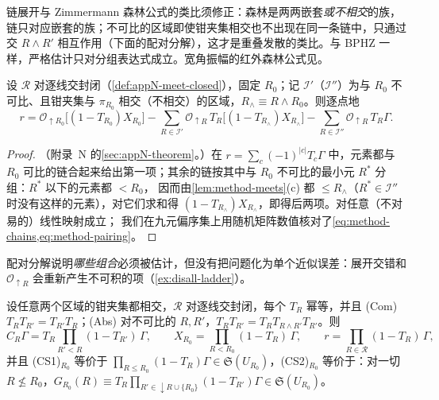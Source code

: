 链展开与 Zimmermann 森林公式\cite{Zimmermann1969}的类比须修正：森林是两两嵌套\emph{或不相交}的族，链只对应嵌套的族；不可比的区域即使钳夹集相交也不出现在同一条链中，只通过交 $R\wedge R'$
相互作用（下面的配对分解），这才是重叠发散的类比。与 BPHZ 一样，严格估计只对分组表达式成立。宽角振幅的红外森林公式见\cite{Ma2020}。

\begin{lemma}[配对分解]\label{lem:method-pairing}
设 $\mathcal R$ 对逐线交封闭（\cref{def:appN-meet-closed}），固定 $R_0$；记 $\mathcal I'$（$\mathcal I''$）为与 $R_0$ 不可比、且钳夹集与 $\pi_{R_0}$ 相交（不相交）的区域，$R_\wedge\equiv R\wedge R_0$。则逐点地
\begin{equation}\label{eq:method-pairing}
r=\mathcal O_{\uparrow R_0}\bigl[(1-T_{R_0})X_{R_0}\bigr]-\sum_{R\in\mathcal I'}\mathcal O_{\uparrow R}\,T_R\bigl[(1-T_{R_\wedge})X_{R_\wedge}\bigr]-\sum_{R\in\mathcal I''}\mathcal O_{\uparrow R}\,T_R\Gamma .
\end{equation}
\end{lemma}

\begin{proof}
（附录~N 的\cref{sec:appN-theorem}。）在 $r=\sum_c(-1)^{|c|}T_c\Gamma$ 中，元素都与 $R_0$ 可比的链合起来给出第一项；其余的链按其中与 $R_0$ 不可比的最小元 $R^*$ 分组：$R^*$ 以下的元素都 $<R_0$，
因而由\cref{lem:method-meets}(c) 都 $\le R_\wedge$（$R^*\in\mathcal I''$ 时没有这样的元素），对它们求和得 $(1-T_{R_\wedge})X_{R_\wedge}$，即得后两项。对任意（不对易的）线性映射成立；
我们在九元偏序集上用随机矩阵数值核对了\cref{eq:method-chains,eq:method-pairing}。%
\end{proof}

配对分解说明\emph{哪些组合}必须被估计，但没有把问题化为单个近似误差：展开交错和 $\mathcal O_{\uparrow R}$ 会重新产生不可积的项（\cref{ex:disall-ladder}）。

\begin{proposition}[乘积公式]\label{prop:method-product}
设任意两个区域的钳夹集都相交，$\mathcal R$ 对逐线交封闭，每个 $T_R$ 幂等，并且 (Com) $T_RT_{R'}=T_{R'}T_R$；(Abs) 对不可比的 $R,R'$，$T_RT_{R'}=T_RT_{R\wedge R'}T_{R'}$。则
\begin{equation}\label{eq:method-product}
C_R\Gamma=T_R\prod_{R'<R}(1-T_{R'})\,\Gamma,\qquad X_{R_0}=\prod_{R<R_0}(1-T_R)\,\Gamma,\qquad r=\prod_{R\in\mathcal R}(1-T_R)\,\Gamma ,
\end{equation}
并且 (CS1)$_{R_0}$ 等价于 $\prod_{R\le R_0}(1-T_R)\Gamma\in\mathfrak S(U_{R_0})$，(CS2)$_{R_0}$ 等价于：对一切 $R\not\le R_0$，$G_{R_0}(R)\equiv T_R\prod_{R'\in\downarrow R\cup\{R_0\}}(1-T_{R'})\Gamma\in\mathfrak S(U_{R_0})$。
\end{proposition}

